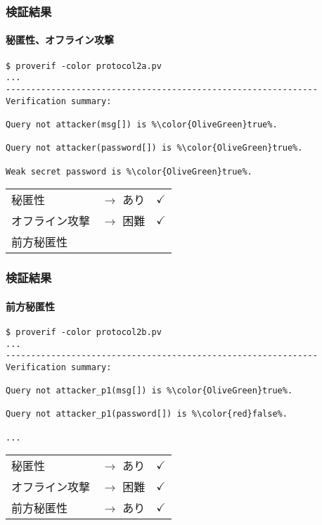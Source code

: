 \documentclass[dvipdfmx, dvipsnames, 11pt]{beamer}
\begin{document}
\begin{frame}[fragile]
  \frametitle{検証結果}
  \framesubtitle{秘匿性、オフライン攻撃}

  \begin{lstlisting}[frame=single]
$ proverif -color protocol2a.pv
...
--------------------------------------------------------------
Verification summary:

Query not attacker(msg[]) is %\color{OliveGreen}true%.

Query not attacker(password[]) is %\color{OliveGreen}true%.

Weak secret password is %\color{OliveGreen}true%.
  \end{lstlisting}

  \begin{table}
    \centering
    \begin{tabular}{lll}
      秘匿性 & $\rightarrow$ あり & \color{OliveGreen}$\checkmark$ \\
      オフライン攻撃 & $\rightarrow$ 困難 & \color{OliveGreen}$\checkmark$ \\
      \color{gray}前方秘匿性 &  &
    \end{tabular}
  \end{table}
\end{frame}

\begin{frame}[fragile]
  \frametitle{検証結果}
  \framesubtitle{前方秘匿性}

  \begin{lstlisting}[frame=single]
$ proverif -color protocol2b.pv
...
--------------------------------------------------------------
Verification summary:

Query not attacker_p1(msg[]) is %\color{OliveGreen}true%.

Query not attacker_p1(password[]) is %\color{red}false%.

...
  \end{lstlisting}

  \begin{table}
    \centering
    \begin{tabular}{lll}
      \color{gray}秘匿性 & \color{gray}$\rightarrow$ あり & \color{OliveGreen}$\checkmark$ \\
      \color{gray}オフライン攻撃 & \color{gray}$\rightarrow$ 困難 & \color{OliveGreen}$\checkmark$ \\
      前方秘匿性 & $\rightarrow$ あり & \color{OliveGreen}$\checkmark$
    \end{tabular}
  \end{table}
\end{frame}
\end{document}
